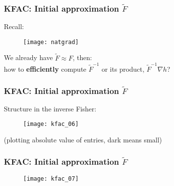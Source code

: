 \begin{frame}
\frametitle{KFAC: Initial approximation $\tilde{F}$}
Recall:
\begin{figure}
    \centering
    \texttt{[image: natgrad]}
\end{figure}

We already have $\tilde{F} \approx F$, then: \\
how to \textbf{efficiently} compute $\tilde{F}^{-1}$ or its product, $\tilde{F}^{-1}\nabla h$?
\end{frame}

\begin{frame}
\frametitle{KFAC: Initial approximation $\tilde{F}$}
Structure in the inverse Fisher:
\begin{figure}
    \centering
    \texttt{[image: kfac\_06]}
\end{figure}
(plotting absolute value of entries, dark means small)
\end{frame}

\begin{frame}
\frametitle{KFAC: Initial approximation $\tilde{F}$}
\begin{figure}
    \centering
    \texttt{[image: kfac\_07]}
\end{figure}
\end{frame}

